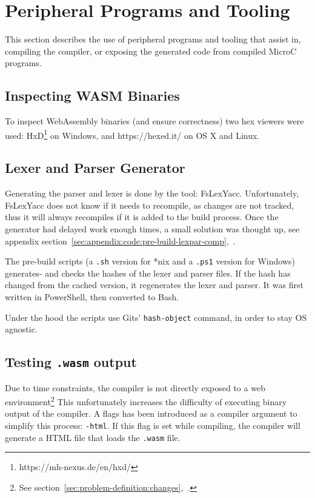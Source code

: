 \documentclass[a4paper]{article}
\begin{document}
\section{Peripheral Programs and Tooling}
\label{sec:peripherals}
This section describes the use of peripheral programs and tooling that assist in, compiling the compiler, or exposing the generated code from compiled MicroC programs.

\subsection{Inspecting WASM Binaries}
\label{sec:peripherals:inspecting-wasm}
To inspect WebAssembly binaries (and ensure correctness) two hex viewers were used: HxD\footnote{https://mh-nexus.de/en/hxd/} on Windows, and https://hexed.it/ on OS X and Linux.

\subsection{Lexer and Parser Generator}
\label{sec:peripherals:lexpargen}
Generating the parser and lexer is done by the tool: FsLexYacc. Unfortunately, FsLexYacc does not know if it needs to recompile, as changes are not tracked, thus it will always recompiles if it is added to the build process. Once the generator had delayed work enough times, a small solution was thought up, see appendix section~\ref{sec:appendix:code:pre-build-lexpar-comp},~.

The pre-build scripts (a \texttt{.sh} version for *nix and a \texttt{.ps1} version for Windows) generates- and checks the hashes of the lexer and parser files. If the hash has changed from the cached version, it regenerates the lexer and parser. It was first written in PowerShell, then converted to Bash.

Under the hood the scripts use Gits' \texttt{hash-object} command, in order to stay OS agnostic.

\subsection{Testing \texttt{.wasm} output}
\label{sec:peripherals:testing-wasm}
Due to time constraints, the compiler is not directly exposed to a web environment\footnote{See section~\ref{sec:problem-definition:changes},~.} This unfortunately increases the difficulty of executing binary output of the compiler. A flags has been introduced as a compiler argument to simplify this process: \texttt{-html}. If this flag is set while compiling, the compiler will generate a HTML file that loads the \texttt{.wasm} file.
\end{document}
